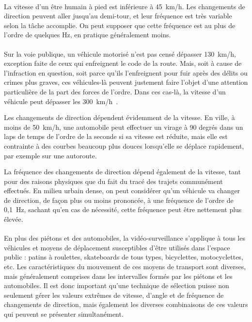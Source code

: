 	\paragraph*{}
	La vitesse d'un être humain à pied est inférieure à 45~km/h. Les changements de direction peuvent aller jusqu'au demi-tour, et leur fréquence est très variable selon la tâche accomplie. On peut supposer que cette fréquence est au plus de l'ordre de quelques Hz, en pratique généralement moins.

	\paragraph*{}	
	Sur la voie publique, un véhicule motorisé n'est pas censé dépasser 130~km/h, exception faite de ceux qui enfreignent le code de la route. Mais, soit à cause de l'infraction en question, soit parce qu'ils l'enfreignent pour fuir après des délits ou crimes plus graves, ces véhicules-là peuvent justement faire l'objet d'une attention particulière de la part des forces de l'ordre. Dans ces cas-là, la vitesse d'un véhicule peut dépasser les 300~km/h~\cite{speeding}.
	
	Les changements de direction dépendent évidemment de la vitesse. En ville, à moins de 50~km/h, une automobile peut effectuer un virage à 90 degrés dans un laps de temps de l'ordre de la seconde si sa vitesse est réduite, mais elle est contrainte à des courbes beaucoup plus douces lorsqu'elle se déplace rapidement, par exemple sur une autoroute.
	
	La fréquence des changements de direction dépend également de la vitesse, tant pour des raisons physiques que du fait du tracé des trajets communément effectués. En milieu urbain dense, on peut considérer qu'un véhicule va changer de direction, de façon plus ou moins prononcée, à une fréquence de l'ordre de 0,1~Hz, sachant qu'en cas de nécessité, cette fréquence peut être nettement plus élevée.
	
	\paragraph*{}
	En plus des piétons et des automobiles, la vidéo-surveillance s'applique à tous les véhicules et moyens de déplacement susceptibles d'être utilisés dans l'espace public : patins à roulettes, skateboards de tous types, bicyclettes, motocyclettes, etc. Les caractéristiques du mouvement de ces moyens de transport sont diverses, mais généralement comprises dans les intervalles formés par les piétons et les automobiles. Il est donc important qu'une technique de sélection puisse non seulement gérer les valeurs extrêmes de vitesse, d'angle et de fréquence de changements de direction, mais également les diverses combinaisons de ces valeurs qui peuvent se présenter simultanément.
	
